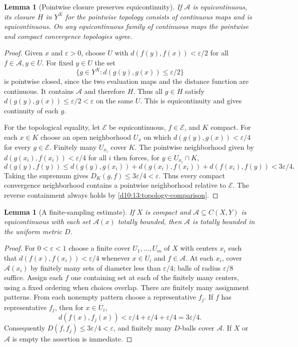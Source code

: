 \documentclass[11pt,oneside,openany]{book}
\newtheorem{lemma}[theorem]{Lemma}
\theoremstyle{definition}
\theoremstyle{remark}
\newcommand{\eps}{\varepsilon}
\begin{document}
\begin{lemma}[Pointwise closure preserves equicontinuity]\label{d10:13:equicontinuous-closure}
If $\mathcal A$ is equicontinuous, its closure $H$ in $Y^X$ for the pointwise topology consists of continuous maps and is equicontinuous. On any equicontinuous family of continuous maps the pointwise and compact convergence topologies agree.
\end{lemma}
\begin{proof}
Given $x$ and $\eps>0$, choose $U$ with $d(f(y),f(x))<\eps/2$ for all $f\in\mathcal A,y\in U$. For fixed $y\in U$ the set
\[
 \{g\in Y^X:d(g(y),g(x))\leq\eps/2\}
\]
is pointwise closed, since the two evaluation maps and the distance function are continuous. It contains $\mathcal A$ and therefore $H$. Thus all $g\in H$ satisfy $d(g(y),g(x))\leq\eps/2<\eps$ on the same $U$. This is equicontinuity and gives continuity of each $g$.

For the topological equality, let $\mathcal E$ be equicontinuous, $f\in\mathcal E$, and $K$ compact. For each $x\in K$ choose an open neighborhood $U_x$ on which $d(g(y),g(x))<\eps/4$ for every $g\in\mathcal E$. Finitely many $U_{x_i}$ cover $K$. The pointwise neighborhood given by $d(g(x_i),f(x_i))<\eps/4$ for all $i$ then forces, for $y\in U_{x_i}\cap K$,
\[
 d(g(y),f(y))\leq d(g(y),g(x_i))+d(g(x_i),f(x_i))+d(f(x_i),f(y))<3\eps/4.
\]
Taking the supremum gives $D_K(g,f)\leq3\eps/4<\eps$. Thus every compact convergence neighborhood contains a pointwise neighborhood relative to $\mathcal E$. The reverse containment always holds by \cref{d10:13:topology-comparison}.
\end{proof}

\begin{lemma}[A finite-sampling estimate]\label{d10:13:finite-sampling}
If $X$ is compact and $\mathcal A\subseteq C(X,Y)$ is equicontinuous with each set $\mathcal A(x)$ totally bounded, then $\mathcal A$ is totally bounded in the uniform metric $D$.
\end{lemma}
\begin{proof}
For $0<\eps<1$ choose a finite cover $U_1,\ldots,U_m$ of $X$ with centers $x_i$ such that $d(f(x),f(x_i))<\eps/4$ whenever $x\in U_i$ and $f\in\mathcal A$. At each $x_i$, cover $\mathcal A(x_i)$ by finitely many sets of diameter less than $\eps/4$; balls of radius $\eps/8$ suffice. Assign each $f$ one containing set at each of the finitely many centers, using a fixed ordering when choices overlap. There are finitely many assignment patterns. From each nonempty pattern choose a representative $f_j$. If $f$ has representative $f_j$, then for $x\in U_i$,
\[
 d(f(x),f_j(x))<\eps/4+\eps/4+\eps/4=3\eps/4.
\]
Consequently $D(f,f_j)\leq3\eps/4<\eps$, and finitely many $D$-balls cover $\mathcal A$. If $X$ or $\mathcal A$ is empty the assertion is immediate.
\end{proof}
\end{document}
